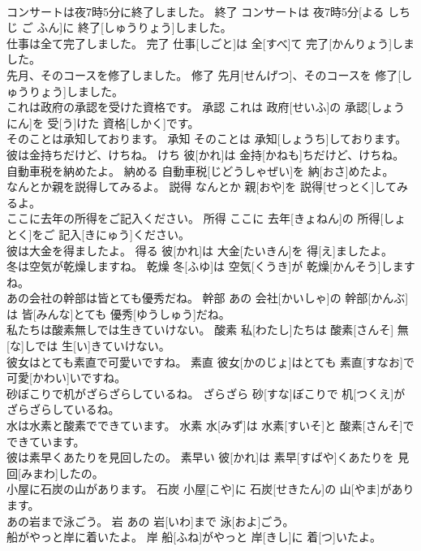 \documentclass[8pt]{extreport}
\begin{document}
\begin{CJK}{UTF8}{min}
\\	コンサートは夜7時5分に終了しました。	終了	コンサートは 夜7時5分[よる しち じ ご ふん]に 終了[しゅうりょう]しました。	
\\	仕事は全て完了しました。	完了	仕事[しごと]は 全[すべ]て 完了[かんりょう]しました。	
\\	先月、そのコースを修了しました。	修了	先月[せんげつ]、そのコースを 修了[しゅうりょう]しました。	
\\	これは政府の承認を受けた資格です。	承認	これは 政府[せいふ]の 承認[しょうにん]を 受[う]けた 資格[しかく]です。	
\\	そのことは承知しております。	承知	そのことは 承知[しょうち]しております。	
\\	彼は金持ちだけど、けちね。	けち	彼[かれ]は 金持[かねも]ちだけど、けちね。	
\\	自動車税を納めたよ。	納める	自動車税[じどうしゃぜい]を 納[おさ]めたよ。	
\\	なんとか親を説得してみるよ。	説得	なんとか 親[おや]を 説得[せっとく]してみるよ。	
\\	ここに去年の所得をご記入ください。	所得	ここに 去年[きょねん]の 所得[しょとく]をご 記入[きにゅう]ください。	
\\	彼は大金を得ましたよ。	得る	彼[かれ]は 大金[たいきん]を 得[え]ましたよ。	
\\	冬は空気が乾燥しますね。	乾燥	冬[ふゆ]は 空気[くうき]が 乾燥[かんそう]しますね。	
\\	あの会社の幹部は皆とても優秀だね。	幹部	あの 会社[かいしゃ]の 幹部[かんぶ]は 皆[みんな]とても 優秀[ゆうしゅう]だね。	
\\	私たちは酸素無しでは生きていけない。	酸素	私[わたし]たちは 酸素[さんそ] 無[な]しでは 生[い]きていけない。	
\\	彼女はとても素直で可愛いですね。	素直	彼女[かのじょ]はとても 素直[すなお]で 可愛[かわい]いですね。	
\\	砂ぼこりで机がざらざらしているね。	ざらざら	砂[すな]ぼこりで 机[つくえ]がざらざらしているね。	
\\	水は水素と酸素でできています。	水素	水[みず]は 水素[すいそ]と 酸素[さんそ]でできています。	
\\	彼は素早くあたりを見回したの。	素早い	彼[かれ]は 素早[すばや]くあたりを 見回[みまわ]したの。	
\\	小屋に石炭の山があります。	石炭	小屋[こや]に 石炭[せきたん]の 山[やま]があります。	
\\	あの岩まで泳ごう。	岩	あの 岩[いわ]まで 泳[およ]ごう。	
\\	船がやっと岸に着いたよ。	岸	船[ふね]がやっと 岸[きし]に 着[つ]いたよ。	

\end{CJK}
\end{document}
